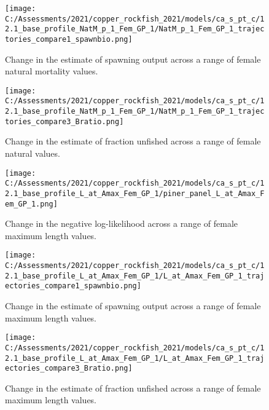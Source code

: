 \documentclass[11pt,
  english,
  a4paper,
]{article}
\begin{document}
\begin{figure}
\centering
\texttt{[image: C:/Assessments/2021/copper\_rockfish\_2021/models/ca\_s\_pt\_c/12.1\_base\_profile\_NatM\_p\_1\_Fem\_GP\_1/NatM\_p\_1\_Fem\_GP\_1\_trajectories\_compare1\_spawnbio.png]}
\caption{Change in the estimate of spawning output across a range of female natural mortality values.\label{fig:m-ssb}}
\end{figure}

\tagmcend\tagstructend


\begin{figure}
\centering
\texttt{[image: C:/Assessments/2021/copper\_rockfish\_2021/models/ca\_s\_pt\_c/12.1\_base\_profile\_NatM\_p\_1\_Fem\_GP\_1/NatM\_p\_1\_Fem\_GP\_1\_trajectories\_compare3\_Bratio.png]}
\caption{Change in the estimate of fraction unfished across a range of female natural values.\label{fig:m-depl}}
\end{figure}

\tagmcend\tagstructend


\begin{figure}
\centering
\texttt{[image: C:/Assessments/2021/copper\_rockfish\_2021/models/ca\_s\_pt\_c/12.1\_base\_profile\_L\_at\_Amax\_Fem\_GP\_1/piner\_panel\_L\_at\_Amax\_Fem\_GP\_1.png]}
\caption{Change in the negative log-likelihood across a range of female maximum length values.\label{fig:linf-profile}}
\end{figure}

\tagmcend\tagstructend


\begin{figure}
\centering
\texttt{[image: C:/Assessments/2021/copper\_rockfish\_2021/models/ca\_s\_pt\_c/12.1\_base\_profile\_L\_at\_Amax\_Fem\_GP\_1/L\_at\_Amax\_Fem\_GP\_1\_trajectories\_compare1\_spawnbio.png]}
\caption{Change in the estimate of spawning output across a range of female maximum length values.\label{fig:linf-ssb}}
\end{figure}

\tagmcend\tagstructend


\begin{figure}
\centering
\texttt{[image: C:/Assessments/2021/copper\_rockfish\_2021/models/ca\_s\_pt\_c/12.1\_base\_profile\_L\_at\_Amax\_Fem\_GP\_1/L\_at\_Amax\_Fem\_GP\_1\_trajectories\_compare3\_Bratio.png]}
\caption{Change in the estimate of fraction unfished across a range of female maximum length values.\label{fig:linf-depl}}
\end{figure}
\end{document}
